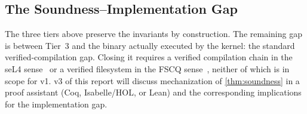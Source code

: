 \subsection{The Soundness--Implementation Gap}\label{sec:m2c-gap}

The three tiers above preserve the invariants by construction. The
remaining gap is between Tier~3 and the binary actually executed by
the kernel: the standard verified-compilation gap. Closing it
requires a verified compilation chain in the seL4
sense~\cite{klein2009sel4} or a verified
filesystem in the FSCQ sense~\cite{chen2015fscq}, neither of
which is in scope for v1. v3 of this report will discuss
mechanization of \cref{thm:soundness} in a proof assistant
(Coq, Isabelle/HOL, or Lean) and the corresponding implications
for the implementation gap.
